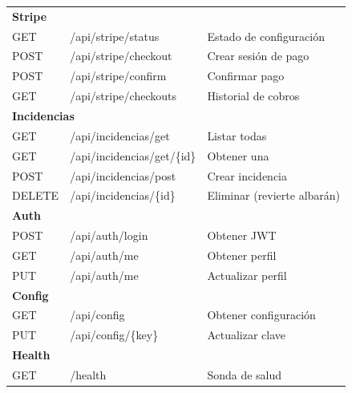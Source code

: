 \documentclass[12pt,twoside,titlepage]{report}
\begin{document}
\begin{longtable}{llp{6cm}}
  \midrule
  \multicolumn{3}{l}{\textbf{Stripe}} \\
  GET    & /api/stripe/status    & Estado de configuración \\
  POST   & /api/stripe/checkout  & Crear sesión de pago \\
  POST   & /api/stripe/confirm   & Confirmar pago \\
  GET    & /api/stripe/checkouts & Historial de cobros \\
  \midrule
  \multicolumn{3}{l}{\textbf{Incidencias}} \\
  GET    & /api/incidencias/get  & Listar todas \\
  GET    & /api/incidencias/get/\{id\} & Obtener una \\
  POST   & /api/incidencias/post & Crear incidencia \\
  DELETE & /api/incidencias/\{id\} & Eliminar (revierte albarán) \\
  \midrule
  \multicolumn{3}{l}{\textbf{Auth}} \\
  POST   & /api/auth/login & Obtener JWT \\
  GET    & /api/auth/me    & Obtener perfil \\
  PUT    & /api/auth/me    & Actualizar perfil \\
  \midrule
  \multicolumn{3}{l}{\textbf{Config}} \\
  GET    & /api/config        & Obtener configuración \\
  PUT    & /api/config/\{key\} & Actualizar clave \\
  \midrule
  \multicolumn{3}{l}{\textbf{Health}} \\
  GET    & /health & Sonda de salud \\
  \bottomrule
\end{longtable}


\end{document}
